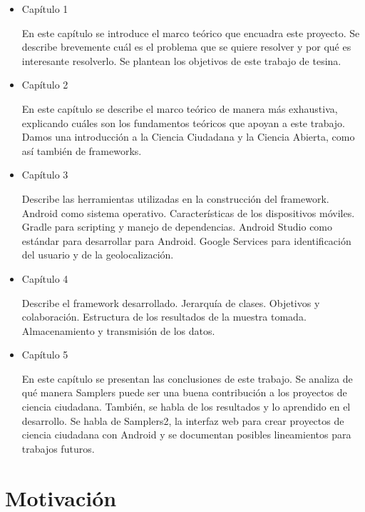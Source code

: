 \begin{itemize} 
	\item{Capítulo 1} 
		\begin{description} En este capítulo se introduce el marco teórico que encuadra este proyecto. Se describe brevemente cuál es el problema que se quiere resolver y por qué es interesante resolverlo. Se plantean los objetivos de este trabajo de tesina.
		\end{description}

	\item{Capítulo 2} 
		\begin{description} En este capítulo se describe el marco teórico de manera más exhaustiva, explicando cuáles son los fundamentos teóricos que apoyan a este trabajo. Damos una introducción a la Ciencia Ciudadana y la Ciencia Abierta, como así también de frameworks.
		\end{description}
	
	\item{Capítulo 3} 
		\begin{description} Describe las herramientas utilizadas en la construcción del framework. Android como sistema operativo. Características de los dispositivos móviles. Gradle para scripting y manejo de dependencias. Android Studio como estándar para desarrollar para Android. Google Services para identificación del usuario y de la geolocalización. 
		\end{description}
	
	\item{Capítulo 4} 
		\begin{description} Describe el framework desarrollado. Jerarquía de clases. Objetivos y colaboración. Estructura de los resultados de la muestra tomada. Almacenamiento y transmisión de los datos.
		\end{description}

	\item{Capítulo 5} 
		\begin{description} En este capítulo se presentan las conclusiones de este trabajo. Se analiza de qué manera Samplers puede ser una buena contribución a los proyectos de ciencia ciudadana. También, se habla de los resultados y lo aprendido en el desarrollo. Se habla de Samplers2, la interfaz web para crear proyectos de ciencia ciudadana con Android y se documentan posibles lineamientos para trabajos futuros.
		\end{description}
\end{itemize}
\section{ Motivación }

